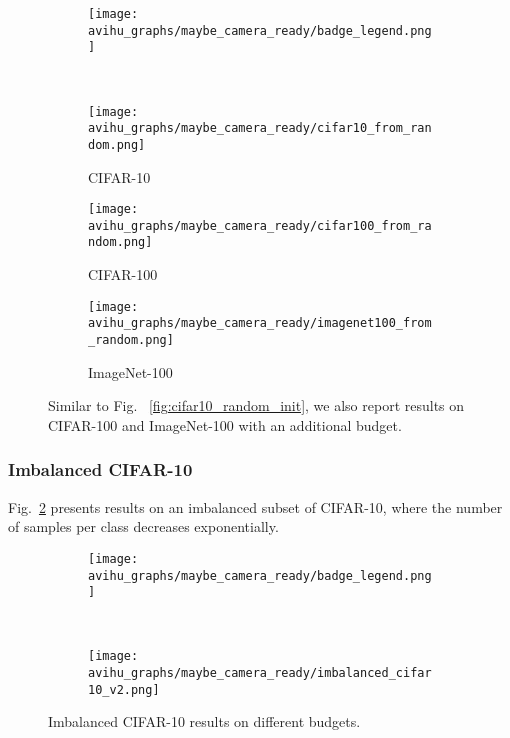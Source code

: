 \documentclass{article}
\begin{document}
\begin{figure}[htb!]
\begin{subfigure}{.45\textwidth}
  \centering
 \texttt{[image: avihu\_graphs/maybe\_camera\_ready/badge\_legend.png]}
\end{subfigure}
\\
\begin{center}
    \begin{subfigure}{.157\textwidth}
      \centering
      \texttt{[image: avihu\_graphs/maybe\_camera\_ready/cifar10\_from\_random.png]}
\caption{CIFAR-10}
    \end{subfigure}
    \begin{subfigure}{.157\textwidth}
      \centering
      \texttt{[image: avihu\_graphs/maybe\_camera\_ready/cifar100\_from\_random.png]}
\caption{CIFAR-100}
    \end{subfigure}
    \begin{subfigure}{.157\textwidth}
      \centering
      \texttt{[image: avihu\_graphs/maybe\_camera\_ready/imagenet100\_from\_random.png]}
\caption{ImageNet-100}
    \end{subfigure}
\caption{Similar to Fig. ~\ref{fig:cifar10_random_init}, we also report results on CIFAR-100 and ImageNet-100 with an additional budget.}
\vspace{-0.3cm}
\label{fig:app:random_init_pool}
\end{center}
\end{figure}


\subsubsection{Imbalanced CIFAR-10}
Fig.~\ref{fig:app:imbalanced_data} presents results on an imbalanced subset of CIFAR-10, where the number of samples per class decreases exponentially.


\begin{figure}[htb!]
\begin{center}
\begin{subfigure}{.45\textwidth}
  \centering
 \texttt{[image: avihu\_graphs/maybe\_camera\_ready/badge\_legend.png]}
\end{subfigure}
\\
    \begin{subfigure}{.45\textwidth}
      \centering
      \texttt{[image: avihu\_graphs/maybe\_camera\_ready/imbalanced\_cifar10\_v2.png]}
\end{subfigure}
\caption{Imbalanced CIFAR-10 results on  different budgets.}
\vspace{-0.3cm}
\label{fig:app:imbalanced_data}
\end{center}
\end{figure}
\end{document}
